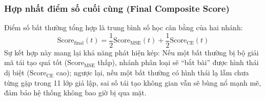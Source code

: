 \documentclass[11pt,journal,onecolumn]{IEEEtran}
\begin{document}
\subsubsection{Hợp nhất điểm số cuối cùng (Final Composite Score)}
Điểm số bất thường tổng hợp là trung bình số học cân bằng của hai nhánh:
\begin{equation}
\label{eq:final_score}
\text{Score}_{\text{final}}(t) = \frac{1}{2}\text{Score}_{\text{MSE}}(t) + \frac{1}{2}\text{Score}_{\text{CE}}(t)
\end{equation}
Sự kết hợp này mang lại khả năng phát hiện kép: Nếu một bất thường bị bộ giải mã tái tạo quá tốt ($\text{Score}_{\text{MSE}}$ thấp), nhánh phân loại sẽ ``bắt bài'' được hình thái dị biệt ($\text{Score}_{\text{CE}}$ cao); ngược lại, nếu một bất thường có hình thái lạ lẫm chưa từng gặp trong 11 lớp giả lập, sai số tái tạo không gian vẫn sẽ bùng nổ mạnh mẽ, đảm bảo hệ thống không bao giờ bị qua mặt.
\end{document}
